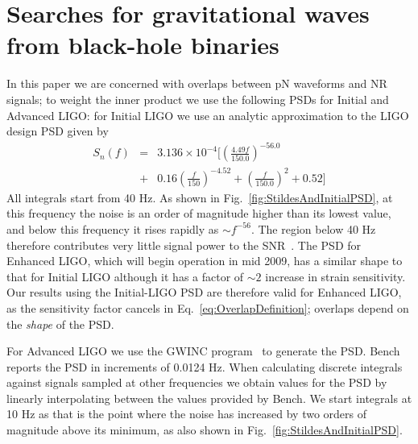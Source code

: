 

\section{Searches for gravitational waves from black-hole binaries}
\label{sec:Searches}


In this paper we are concerned with overlaps between pN waveforms and
NR signals; to weight the inner product we use the following PSDs for
Initial and Advanced LIGO: for Initial LIGO we use an analytic
approximation to the LIGO design PSD given by
\begin{eqnarray}
  S_n(f) &= &3.136 \times 10^{-4} \bigg[
  \left(\frac{ 4.49 f}{150.0}\right)^{-56.0} \nonumber \\
  &+ & 0.16 \left(\frac{f}{150}\right)^{-4.52}
  + \left(\frac{f}{150.0}\right)^2 + 0.52
  \bigg]
\end{eqnarray}
All integrals start from 40 Hz.  As shown in
Fig.~\ref{fig:StildesAndInitialPSD}, at this frequency the noise is an
order of magnitude higher than its lowest value, and below this
frequency it rises rapidly as $\sim f^{-56}$.  The region below 40 Hz
therefore contributes very little signal power to the
SNR~\cite{Abbott:2007xi}.  The PSD for Enhanced LIGO, which will
begin operation in mid 2009, has a similar shape to that for Initial
LIGO although it has a factor of $\sim 2$ increase in strain
sensitivity.  Our results using the Initial-LIGO PSD are therefore
valid for Enhanced LIGO, as the sensitivity factor cancels in
Eq.~\eqref{eq:OverlapDefinition}; overlaps depend on the \emph{shape}
of the PSD.

For Advanced LIGO we use the GWINC program~\cite{AdvancedLIGONoise} to
generate the PSD.  Bench reports the PSD in increments of 0.0124 Hz.
When calculating discrete integrals against signals sampled at other
frequencies we obtain values for the PSD by linearly interpolating
between the values provided by Bench.  We start integrals at 10 Hz as
that is the point where the noise has increased by two orders of
magnitude above its minimum, as also shown in
Fig.~\ref{fig:StildesAndInitialPSD}.




